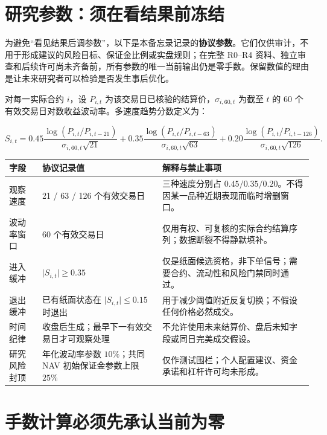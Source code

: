 \section{研究参数：须在看结果前冻结}

为避免“看见结果后调参数”，以下是本备忘录记录的\textbf{协议参数}。它们仅供审计，不用于形成建议的风险目标、保证金比例或实盘规则；在完整 R0--R4 资料、独立审查和后续许可尚未齐备前，所有参数的唯一当前输出仍是零手数。保留数值的理由是让未来研究者可以检验是否发生事后优化。

对每一实际合约 \(i\)，设 \(P_{i,t}\) 为该交易日已核验的结算价，\(\sigma_{i,60,t}\) 为截至 \(t\) 的 60 个有效交易日对数收益波动率。多速度趋势分数定义为：

\[
S_{i,t}=0.45\frac{\log(P_{i,t}/P_{i,t-21})}{\sigma_{i,60,t}\sqrt{21}}
+0.35\frac{\log(P_{i,t}/P_{i,t-63})}{\sigma_{i,60,t}\sqrt{63}}
+0.20\frac{\log(P_{i,t}/P_{i,t-126})}{\sigma_{i,60,t}\sqrt{126}}.
\]

\begin{dashboardbox}[冻结参数与解释]
\begin{tabularx}{\textwidth}{L{3.3cm}L{2.8cm}X}
\toprule
\textbf{字段} & \textbf{协议记录值} & \textbf{解释与禁止事项} \\
\midrule
观察速度 & 21 / 63 / 126 个有效交易日 & 三种速度分别占 \(0.45/0.35/0.20\)。不得因某一品种近期表现而临时增删窗口。 \\
波动率窗口 & 60 个有效交易日 & 仅用有权、可复核的实际合约结算序列；数据断裂不得静默填补。 \\
进入缓冲 & \(\vert S_{i,t}\vert \geq 0.35\) & 仅是纸面候选资格，非下单信号；需要合约、流动性和风险门禁同时通过。 \\
退出缓冲 & 已有纸面状态在 \(\vert S_{i,t}\vert \leq 0.15\) 时退出 & 用于减少阈值附近反复切换；不假设任何价格必然成交。 \\
时间纪律 & 收盘后生成；最早下一有效交易日才可观察处理 & 不允许使用未来结算价、盘后未知字段或同日完美成交假设。 \\
研究风险封顶 & 年化波动率参数 \(10\%\)；共同 NAV 初始保证金参数上限 \(25\%\) & 仅作测试围栏；个人配置建议、资金承诺和杠杆许可均未形成。 \\
\bottomrule
\end{tabularx}
\end{dashboardbox}

\section{手数计算必须先承认当前为零}

